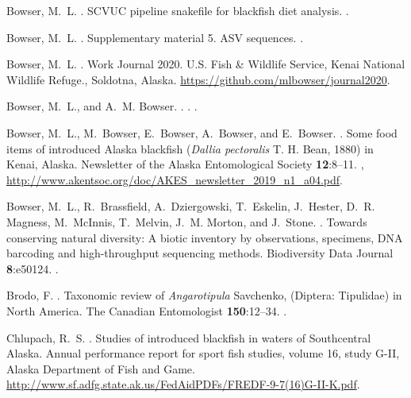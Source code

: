 \begin{multicols}{2}
\begin{thebibliography}{37}
Bowser, M.~L.
.
\newblock SCVUC pipeline snakefile for blackfish diet analysis.
\newblock {}.

Bowser, M.~L.
.
\newblock Supplementary material 5. ASV sequences.
\newblock {}.

Bowser, M.~L.
.
\newblock Work Journal 2020.
\newblock U.S. Fish \& Wildlife Service, Kenai National Wildlife Refuge.,
  Soldotna, Alaska.
\newblock \urlprefix\url{https://github.com/mlbowser/journal2020}.

Bowser, M.~L., and A.~M. Bowser.
.
.
\newblock {}.

Bowser, M.~L., M.~Bowser, E.~Bowser, A.~Bowser, and E.~Bowser.
.
\newblock Some food items of introduced Alaska blackfish (\textit{Dallia
  pectoralis} T. H. Bean, 1880) in Kenai, Alaska.
\newblock Newsletter of the Alaska Entomological Society {\bfseries 12}:8--11.
\newblock {},
  \urlprefix\url{http://www.akentsoc.org/doc/AKES_newsletter_2019_n1_a04.pdf}.

Bowser, M.~L., R.~Brassfield, A.~Dziergowski, T.~Eskelin, J.~Hester, D.~R.
  Magness, M.~McInnis, T.~Melvin, J.~M. Morton, and J.~Stone.
.
\newblock Towards conserving natural diversity: A biotic inventory by
  observations, specimens, DNA barcoding and high-throughput sequencing
  methods.
\newblock Biodiversity Data Journal {\bfseries 8}:e50124.
\newblock {}.

Brodo, F.
.
\newblock Taxonomic review of \textit{Angarotipula} Savchenko, (Diptera:
  Tipulidae) in North America.
\newblock The Canadian Entomologist {\bfseries 150}:12–34.
\newblock {}.

Chlupach, R.~S.
.
\newblock Studies of introduced blackfish in waters of Southcentral Alaska.
\newblock Annual performance report for sport fish studies, volume 16, study
  G-II, Alaska Department of Fish and Game.
\newblock
  \urlprefix\url{http://www.sf.adfg.state.ak.us/FedAidPDFs/FREDF-9-7(16)G-II-K.pdf}.


\end{thebibliography}
\end{multicols}
